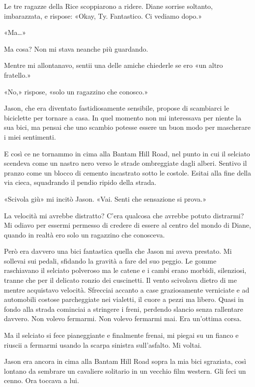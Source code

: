 Le tre ragazze della Rice scoppiarono a ridere. Diane sorrise soltanto,
imbarazzata, e rispose: «Okay, Ty. Fantastico. Ci vediamo dopo.»

«Ma\ldots»

Ma cosa? Non mi stava neanche più guardando.

Mentre mi allontanavo, sentii una delle amiche chiederle se ero «un
altro fratello.»

«No,» rispose, «solo un ragazzino che conosco.»

\separatorefiori

Jason, che era diventato fastidiosamente sensibile, propose di
scambiarci le biciclette per tornare a casa. In quel momento non mi
interessava per niente la sua bici, ma pensai che uno scambio potesse
essere un buon modo per mascherare i miei sentimenti.

E così ce ne tornammo in cima alla Bantam Hill Road, nel punto in cui il
selciato scendeva come un nastro nero verso le strade ombreggiate dagli
alberi. Sentivo il pranzo come un blocco di cemento incastrato sotto le
costole. Esitai alla fine della via cieca, squadrando il pendio ripido
della strada.

«Scivola giù» mi incitò Jason. «Vai. Senti che sensazione si prova.»

La velocità mi avrebbe distratto? C'era qualcosa che avrebbe potuto
distrarmi? Mi odiavo per essermi permesso di credere di essere al centro
del mondo di Diane, quando in realtà ero solo un ragazzino che
conosceva.

Però era davvero una bici fantastica quella che Jason mi aveva prestato.
Mi sollevai sui pedali, sfidando la gravità a fare del suo peggio. Le
gomme raschiavano il selciato polveroso ma le catene e i cambi erano
morbidi, silenziosi, tranne che per il delicato ronzio dei cuscinetti.
Il vento scivolava dietro di me mentre acquistavo velocità. Sfrecciai
accanto a case graziosamente verniciate e ad automobili costose
parcheggiate nei vialetti, il cuore a pezzi ma libero. Quasi in fondo
alla strada cominciai a stringere i freni, perdendo slancio senza
rallentare davvero. Non volevo fermarmi. Non volevo fermarmi mai. Era
un'ottima corsa.

Ma il selciato si fece pianeggiante e finalmente frenai, mi piegai su un
fianco e riuscii a fermarmi usando la scarpa sinistra sull'asfalto. Mi
voltai.

Jason era ancora in cima alla Bantam Hill Road sopra la mia bici
sgraziata, così lontano da sembrare un cavaliere solitario in un vecchio
film western. Gli feci un cenno. Ora toccava a lui.

